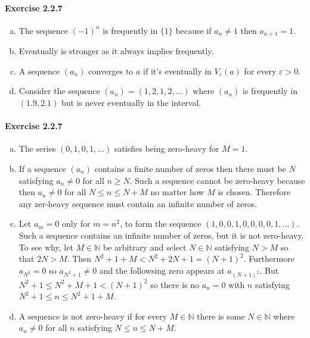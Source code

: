 \documentclass{article}
\newcommand{\N}{\mathbb{N}}
\begin{document}
\paragraph{Exercise 2.2.7}
\begin{enumerate}[(a)]
	\item
	The sequence $(-1)^n$ is frequently in $\{1\}$ because if $a_n \neq 1$ then $a_{n+1} = 1$.

	\item
	Eventually is stronger as it always implies frequently.

	\item 
	A sequence $(a_n)$ converges to $a$ if it's eventually in $V_\varepsilon(a)$ for every $\varepsilon > 0$.

	\item
	Consider the sequence $(a_n) = (1,2,1,2,\ldots)$ where $(a_n)$ is frequently in $(1.9,2.1)$ but is never eventually in the interval.
\end{enumerate}

\paragraph{Exercise 2.2.7}
\begin{enumerate}[(a)]
	\item
	The series $(0,1,0,1,\ldots)$ satisfies being zero-heavy for $M=1$.
	
	\item
	If a sequence $(a_n)$ contains a finite number of zeros then there must be $N$ satisfying $a_n \neq 0$ for all $n\geq N$.
	Such a sequence cannot be zero-heavy because then $a_n \neq 0$ for all $N \leq n \leq N + M$ no matter how $M$ is chosen.
	Therefore any zer-heavy sequence must contain an infinite number of zeros.

	\item
	Let $a_{m} = 0$ only for $m = n^2$, to form the sequence $(1,0,0,1,0,0,0,0,1,\ldots)$.
	Such a sequence contains an infinite number of zeros, but it is not zero-heavy.
	To see why, let $M \in \N$ be arbitrary and select $N \in \N$ satisfying $N > M$ so that $2N > M$.
	Then $N^2 + 1 + M < N^2 + 2N + 1 = (N+1)^2$.   
	Furthermore $a_{N^2} = 0$ so $a_{N^2 + 1} \neq 0$ and the followsing zero appears at $a_{(N+1)^2}$.
	But $N^2 + 1 \leq N^2 + M + 1 < (N+1)^2$ so there is no $a_n=0$ with $n$ satisfying $N^2+1 \leq n \leq N^2+1 + M$.

	\item
	A sequence is not zero-heavy if for every $M \in \N$ there is some $N \in \N$ where $a_n \neq 0$ for all $n$ satisfying $N\leq n \leq N+M$.
\end{enumerate}
\end{document}
